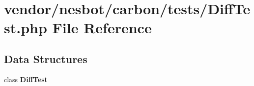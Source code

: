 \section{vendor/nesbot/carbon/tests/\+Diff\+Test.php File Reference}
\label{_diff_test_8php}
\subsection*{Data Structures}
\begin{DoxyCompactItemize}
\item 
class {\bf Diff\+Test}
\end{DoxyCompactItemize}
